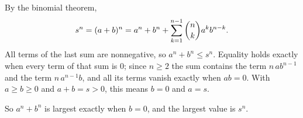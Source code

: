 By the binomial theorem,
\[s^n=(a+b)^n=a^n+b^n+\sum_{k=1}^{n-1}\dbinom nk a^kb^{n-k}.\]
All terms of the last sum are nonnegative, so $a^n+b^n\le s^n$. Equality holds exactly when every term of that sum is $0$; since $n\ge2$ the sum contains the term $n\,ab^{n-1}$ and the term $n\,a^{n-1}b$, and all its terms vanish exactly when $ab=0$. With $a\ge b\ge0$ and $a+b=s>0$, this means $b=0$ and $a=s$.

So $a^n+b^n$ is largest exactly when $b=0$, and the largest value is $\boxed{s^n}$.
